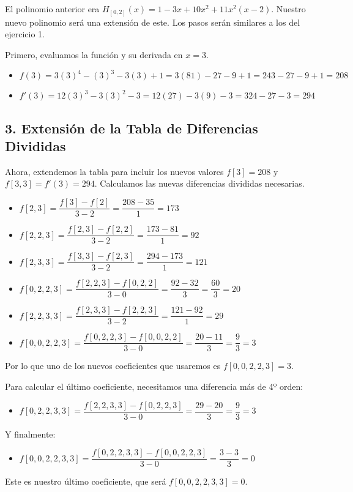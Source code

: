 \documentclass{article}
\begin{document}
El polinomio anterior era \(H_{[0,2]}(x) = 1 - 3x + 10x^2 + 11x^2(x-2)\). Nuestro nuevo polinomio será una extensión de este. Los pasos serán similares a los del ejercicio 1.

Primero, evaluamos la función y su derivada en  \(x=3\).
\begin{itemize}
    \item \(f(3) = 3(3)^4 - (3)^3 - 3(3) + 1 = 3(81) - 27 - 9 + 1 = 243 - 27 - 9 + 1 = 208\)
    \item \(f'(3) = 12(3)^3 - 3(3)^2 - 3 = 12(27) - 3(9) - 3 = 324 - 27 - 3 = 294\)
\end{itemize}

\subsection*{3. Extensión de la Tabla de Diferencias Divididas}
Ahora, extendemos la tabla para incluir los nuevos valores \(f[3]=208\) y \(f[3,3]=f'(3)=294\). Calculamos las nuevas diferencias divididas necesarias.

\begin{itemize}
    \item \(f[2,3] = \dfrac{f[3] - f[2]}{3-2} = \dfrac{208 - 35}{1} = 173\)
\end{itemize}

\begin{itemize}
    \item \(f[2,2,3] = \dfrac{f[2,3] - f[2,2]}{3-2} = \dfrac{173 - 81}{1} = 92\)
    \item \(f[2,3,3] = \dfrac{f[3,3] - f[2,3]}{3-2} = \dfrac{294 - 173}{1} = 121\)
\end{itemize}

\begin{itemize}
    \item \(f[0,2,2,3] = \dfrac{f[2,2,3] - f[0,2,2]}{3-0} = \dfrac{92 - 32}{3} = \dfrac{60}{3} = 20\)
    \item \(f[2,2,3,3] = \dfrac{f[2,3,3] - f[2,2,3]}{3-2} = \dfrac{121 - 92}{1} = 29\)
\end{itemize}

\begin{itemize}
    \item \(f[0,0,2,2,3] = \dfrac{f[0,2,2,3] - f[0,0,2,2]}{3-0} = \dfrac{20 - 11}{3} = \dfrac{9}{3} = 3\)
\end{itemize}

Por lo que uno de los nuevos coeficientes que usaremos es $f[0,0,2,2,3] = 3$.

Para calcular el último coeficiente, necesitamos una diferencia más de 4º orden:
\begin{itemize}
    \item \(f[0,2,2,3,3] = \dfrac{f[2,2,3,3] - f[0,2,2,3]}{3-0} = \dfrac{29 - 20}{3} = \dfrac{9}{3} = 3\)
\end{itemize}
Y finalmente:
\begin{itemize}
    \item \(f[0,0,2,2,3,3] = \dfrac{f[0,2,2,3,3] - f[0,0,2,2,3]}{3-0} = \dfrac{3 - 3}{3} = 0\)
\end{itemize}
Este es nuestro último coeficiente, que será \(f[0,0,2,2,3,3] = 0\).
\end{document}
